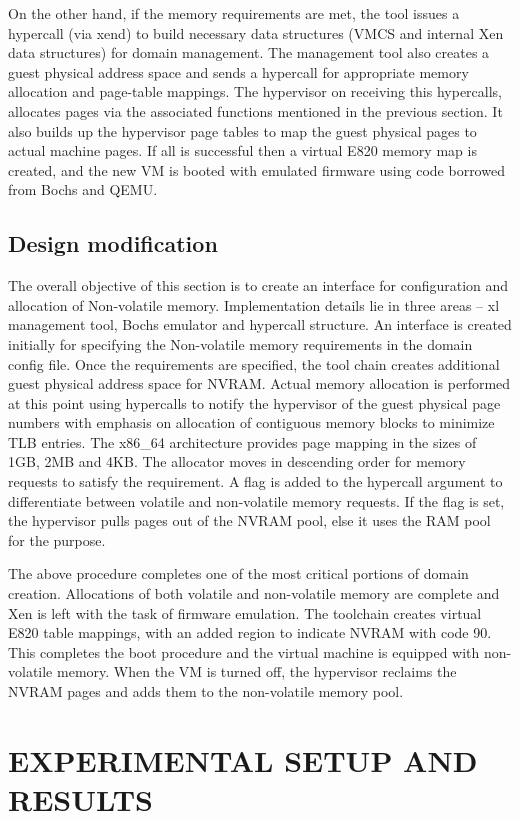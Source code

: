  

On the other hand, if the memory requirements are met, the tool issues a hypercall (via xend) to build necessary data structures (VMCS and internal Xen data structures) for domain management. The management tool also creates a guest physical address space and sends a hypercall for appropriate memory allocation and page-table mappings. The hypervisor on receiving this hypercalls, allocates pages via the associated functions mentioned in the previous section. It also builds up the hypervisor page tables to map the guest physical pages to actual machine pages. If all is successful then a virtual E820 memory map is created, and the new VM is booted with emulated firmware using code borrowed from Bochs and QEMU.  

\section{Design modification}
The overall objective of this section is to create an interface for configuration and allocation of Non-volatile memory. Implementation details lie in three areas – xl management tool, Bochs emulator and hypercall structure. An interface is created initially for specifying the Non-volatile memory requirements in the domain config file. Once the requirements are specified, the tool chain creates additional guest physical address space for NVRAM. Actual memory allocation is performed at this point using hypercalls to notify the hypervisor of the guest physical page numbers with emphasis on allocation of contiguous memory blocks to minimize TLB entries. The x86\_64 architecture provides page mapping in the sizes of 1GB, 2MB and 4KB. The allocator moves in descending order for memory requests to satisfy the requirement. A flag is added to the hypercall argument to differentiate between volatile and non-volatile memory requests. If the flag is set, the hypervisor pulls pages out of the NVRAM pool, else it uses the RAM pool for the purpose. 

 

The above procedure completes one of the most critical portions of domain creation. Allocations of both volatile and non-volatile memory are complete and Xen is left with the task of firmware emulation. The toolchain creates virtual E820 table mappings, with an added region to indicate NVRAM with code 90. This completes the boot procedure and the virtual machine is equipped with non-volatile memory. When the VM is turned off, the hypervisor reclaims the NVRAM pages and adds them to the non-volatile memory pool.

\chapter{\uppercase{Experimental Setup and Results}}

